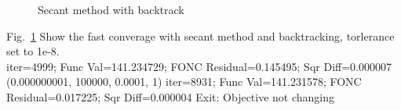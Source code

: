 \documentclass[12pt,twoside]{article}
\begin{document}
\begin{enumerate}[1)]
\begin{figure}[tb]
\caption{Secant method with backtrack}
\label{fig:secantAndBacktrack fig}
\end{figure}
Fig.~\ref{fig:secantAndBacktrack fig} Show the fast converage with secant method and backtracking, torlerance set to 1e-8.\\
iter=4999; Func Val=141.234729; FONC Residual=0.145495; Sqr Diff=0.000007\\

(0.000000001, 100000, 0.0001, 1)
iter=8931; Func Val=141.231578; FONC Residual=0.017225; Sqr Diff=0.000004
Exit: Objective not changing
\end{enumerate}
\end{document}
